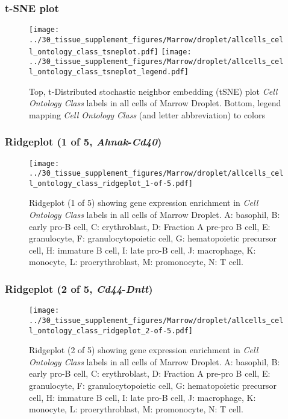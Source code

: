 \clearpage
\subsubsection{t-SNE plot}
\begin{figure}[h]
\centering
\texttt{[image: ../30\_tissue\_supplement\_figures/Marrow/droplet/allcells\_cell\_ontology\_class\_tsneplot.pdf]}
\texttt{[image: ../30\_tissue\_supplement\_figures/Marrow/droplet/allcells\_cell\_ontology\_class\_tsneplot\_legend.pdf]}
\caption{Top, t-Distributed stochastic neighbor embedding (tSNE) plot  \emph{Cell Ontology Class} labels in all cells of Marrow Droplet. Bottom, legend mapping \emph{Cell Ontology Class} (and letter abbreviation) to colors}
\end{figure}


\clearpage

\subsubsection{Ridgeplot (1 of 5, \emph{Ahnak}-\emph{Cd40})}
\begin{figure}[h]
\centering
\texttt{[image: ../30\_tissue\_supplement\_figures/Marrow/droplet/allcells\_cell\_ontology\_class\_ridgeplot\_1-of-5.pdf]}

\caption{ Ridgeplot (1 of 5)  showing gene expression enrichment in \emph{Cell Ontology Class} labels in all cells of Marrow Droplet. A: basophil, B: early pro-B cell, C: erythroblast, D: Fraction A pre-pro B cell, E: granulocyte, F: granulocytopoietic cell, G: hematopoietic precursor cell, H: immature B cell, I: late pro-B cell, J: macrophage, K: monocyte, L: proerythroblast, M: promonocyte, N: T cell.}
\end{figure}


\clearpage

\subsubsection{Ridgeplot (2 of 5, \emph{Cd44}-\emph{Dntt})}
\begin{figure}[h]
\centering
\texttt{[image: ../30\_tissue\_supplement\_figures/Marrow/droplet/allcells\_cell\_ontology\_class\_ridgeplot\_2-of-5.pdf]}

\caption{ Ridgeplot (2 of 5)  showing gene expression enrichment in \emph{Cell Ontology Class} labels in all cells of Marrow Droplet. A: basophil, B: early pro-B cell, C: erythroblast, D: Fraction A pre-pro B cell, E: granulocyte, F: granulocytopoietic cell, G: hematopoietic precursor cell, H: immature B cell, I: late pro-B cell, J: macrophage, K: monocyte, L: proerythroblast, M: promonocyte, N: T cell.}
\end{figure}


